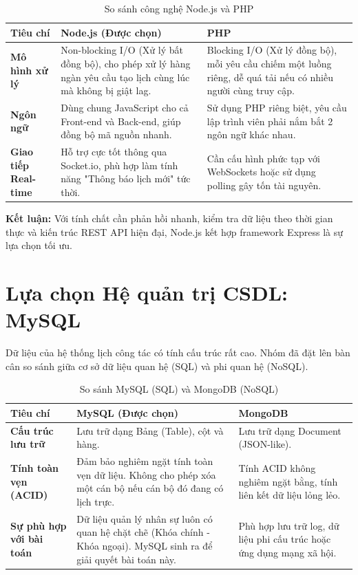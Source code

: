 \documentclass[18pt,a4paper]{report}
\begin{document}
\begin{table}[H]
\centering
\caption{So sánh công nghệ Node.js và PHP}
\begin{tabularx}{\textwidth}{|>{\raggedright\arraybackslash}p{3cm}|X|X|}
\hline
\textbf{Tiêu chí} & \textbf{Node.js (Được chọn)} & \textbf{PHP} \\ \hline
\textbf{Mô hình xử lý} & Non-blocking I/O (Xử lý bất đồng bộ), cho phép xử lý hàng ngàn yêu cầu tạo lịch cùng lúc mà không bị giật lag. & Blocking I/O (Xử lý đồng bộ), mỗi yêu cầu chiếm một luồng riêng, dễ quá tải nếu có nhiều người cùng truy cập. \\ \hline
\textbf{Ngôn ngữ} & Dùng chung JavaScript cho cả Front-end và Back-end, giúp đồng bộ mã nguồn nhanh. & Sử dụng PHP riêng biệt, yêu cầu lập trình viên phải nắm bắt 2 ngôn ngữ khác nhau. \\ \hline
\textbf{Giao tiếp Real-time} & Hỗ trợ cực tốt thông qua Socket.io, phù hợp làm tính năng "Thông báo lịch mới" tức thời. & Cần cấu hình phức tạp với WebSockets hoặc sử dụng polling gây tốn tài nguyên. \\ \hline
\end{tabularx}
\end{table}
\textbf{Kết luận:} Với tính chất cần phản hồi nhanh, kiểm tra dữ liệu theo thời gian thực và kiến trúc REST API hiện đại, Node.js kết hợp framework Express là sự lựa chọn tối ưu.

\section{Lựa chọn Hệ quản trị CSDL: MySQL}
Dữ liệu của hệ thống lịch công tác có tính cấu trúc rất cao. Nhóm đã đặt lên bàn cân so sánh giữa cơ sở dữ liệu quan hệ (SQL) và phi quan hệ (NoSQL).

\begin{table}[H]
\centering
\caption{So sánh MySQL (SQL) và MongoDB (NoSQL)}
\begin{tabularx}{\textwidth}{|>{\raggedright\arraybackslash}p{3cm}|X|X|}
\hline
\textbf{Tiêu chí} & \textbf{MySQL (Được chọn)} & \textbf{MongoDB} \\ \hline
\textbf{Cấu trúc lưu trữ} & Lưu trữ dạng Bảng (Table), cột và hàng. & Lưu trữ dạng Document (JSON-like). \\ \hline
\textbf{Tính toàn vẹn (ACID)} & Đảm bảo nghiêm ngặt tính toàn vẹn dữ liệu. Không cho phép xóa một cán bộ nếu cán bộ đó đang có lịch trực. & Tính ACID không nghiêm ngặt bằng, tính liên kết dữ liệu lỏng lẻo. \\ \hline
\textbf{Sự phù hợp với bài toán} & Dữ liệu quản lý nhân sự luôn có quan hệ chặt chẽ (Khóa chính - Khóa ngoại). MySQL sinh ra để giải quyết bài toán này. & Phù hợp lưu trữ log, dữ liệu phi cấu trúc hoặc ứng dụng mạng xã hội. \\ \hline
\end{tabularx}
\end{table}
\end{document}
